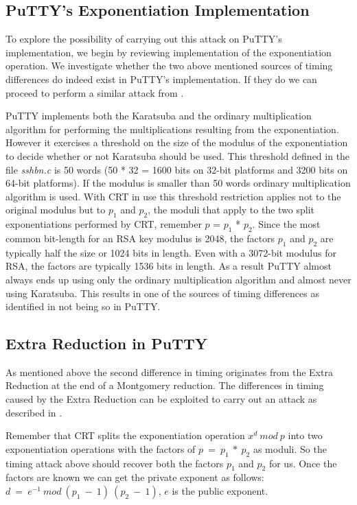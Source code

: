 \documentclass{bhamthesis}
\begin{document}
\subsection{PuTTY's Exponentiation Implementation}
To explore the possibility of carrying out this attack on PuTTY's implementation, we begin by reviewing implementation of the exponentiation operation. We investigate whether the two above mentioned sources of timing differences do indeed exist in PuTTY's implementation. If they do we can proceed to perform a similar attack from \cite{brumley}.\par
PuTTY implements both the Karatsuba and the ordinary multiplication algorithm for performing the multiplications resulting from the exponentiation. However it exercises a  threshold on the size of the modulus of the exponentiation to decide whether or not Karatsuba should be used. This threshold defined in the file \textit{sshbn.c} is 50 words (50 * 32 = 1600 bits on 32-bit platforms and 3200 bits on 64-bit platforms). If the modulus is smaller than 50 words ordinary multiplication algorithm is used. With CRT in use this threshold restriction applies not to the original modulus but to \(p_1\) and \(p_2\), the moduli that apply to the two split exponentiations performed by CRT, remember \(p\) = \(p_1\) * \(p_2\). Since the most common bit-length for an RSA key modulus is 2048, the factors \(p_1\) and \(p_2\) are typically half the size or 1024 bits in length. Even with a 3072-bit modulus for RSA, the factors are typically 1536 bits in length. As a result PuTTY almost always ends up using only the ordinary multiplication algorithm and almost never using Karatsuba. This results in one of the sources of timing differences as identified in \cite{brumley} not being so in PuTTY.\par
\subsection{Extra Reduction in PuTTY}
As mentioned above the second difference in timing originates from the Extra Reduction at the end of a Montgomery reduction. The differences in timing caused by the Extra Reduction can be exploited to carry out an attack as described in \cite{brumley}.\par
Remember that CRT splits the exponentiation operation \(x^d\ mod\ p\) into two exponentiation operations with the factors of \(p\ =\ p_1\ *\ p_2\) as moduli. So the timing attack above should recover both the factors \(p_1\)  and \(p_2\) for us. Once the factors are known we can get the private exponent as follows:\\
    \(d\ =\ e^{-1}\ mod\ ({p_1}\ -\ 1 )\ ({p_2}\ -\ 1)\), \(e\) is the public exponent.
\end{document}
